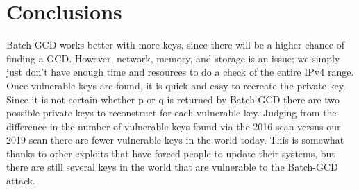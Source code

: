 \documentclass[10pt, letterpaper]{article}
\begin{document}
\section{Conclusions}
Batch-GCD works better with more keys, since there will be a higher chance of finding a GCD. However, network, memory, and storage is an issue; we simply just don't have enough time and resources to do a check of the entire IPv4 range. Once vulnerable keys are found, it is quick and easy to recreate the private key. Since it is not certain whether p or q is returned by Batch-GCD there are two possible private keys to reconstruct for each vulnerable key. Judging from the difference in the number of vulnerable keys found via the 2016 scan versus our 2019 scan there are fewer vulnerable keys in the world today. This is somewhat thanks to other exploits that have forced people to update their systems, but there are still several keys in the world that are vulnerable to the Batch-GCD attack.
\end{document}
